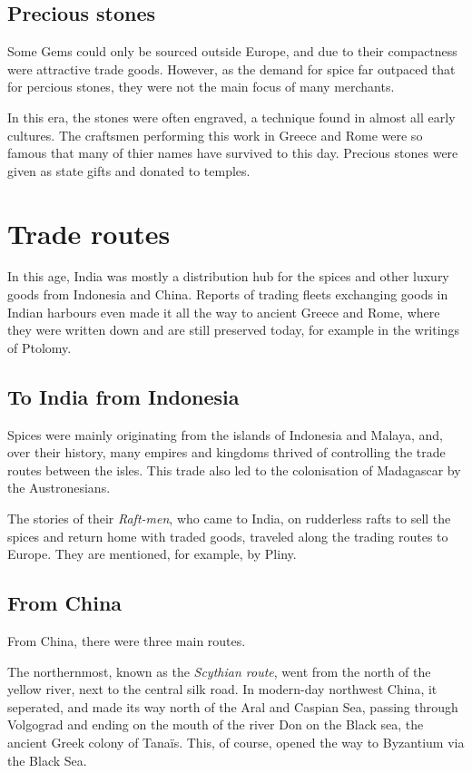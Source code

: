 \documentclass[11pt, a4paper]{scrreprt}
\begin{document}
\subsection{Precious stones}
Some Gems could only be sourced outside Europe, and due to their compactness were attractive trade goods. However, as the demand for spice far outpaced that for percious stones\autocite{Rome}, they were not the main focus of many merchants.

In this era, the stones were often engraved, a technique found in almost all early cultures. The craftsmen performing this work in Greece and Rome were so famous that many of thier names have survived to this day. Precious stones were given as state gifts and donated to temples.\autocite{RG}
\section{Trade routes}
In this age, India was mostly a distribution hub for the spices and other luxury goods from Indonesia and China. Reports of trading fleets exchanging goods in Indian harbours even made it all the way to ancient Greece and Rome, where they were written down and are still preserved today, for example in the writings of Ptolomy.\autocite[p.~148-150]{Rome}

\subsection{To India from Indonesia}

Spices were mainly originating from the islands of Indonesia and Malaya, and, over their history, many empires and kingdoms thrived of controlling the trade routes between the isles. This trade also led to the colonisation of Madagascar by the Austronesians.\autocite{Madagascar}

The stories of their \emph{Raft-men}, who came to India, on rudderless rafts to sell the spices and return home with traded goods, traveled along the trading routes to Europe. They are mentioned, for example, by Pliny.\autocite[Chapter 8]{Rome}

\subsection{From China}

From China, there were three main routes.

The northernmost, known as the \emph{Scythian route}, went from the north of the yellow river, next to the central silk road. In modern-day northwest China, it seperated, and made its way north of the Aral and Caspian Sea, passing through Volgograd and ending on the mouth of the river Don on the Black sea, the ancient Greek colony of Tana\"{i}s. This, of course, opened the way to Byzantium via the Black Sea.\autocite[149]{Rome}
\end{document}
